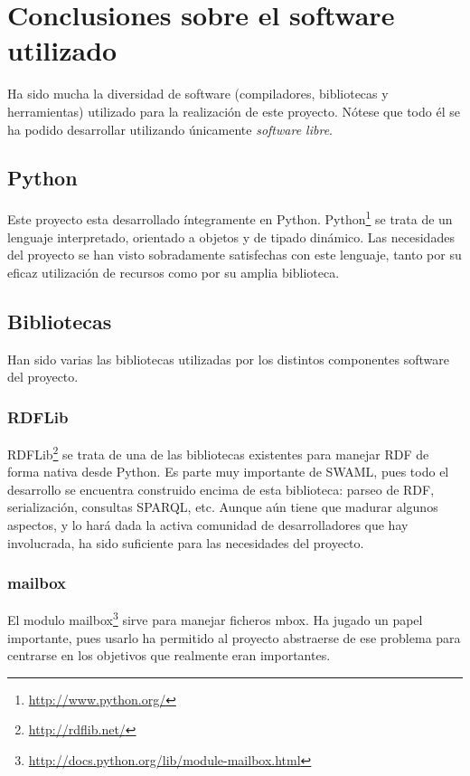 
\section{Conclusiones sobre el software utilizado}

Ha sido mucha la diversidad de software (compiladores, bibliotecas y herramientas)
utilizado para la realización de este proyecto. Nótese que todo él se ha podido
desarrollar utilizando únicamente \emph{software libre}.

\subsection{Python}

Este proyecto esta desarrollado íntegramente en Python. Python\footnote{\url{http://www.python.org/}}
se trata de un lenguaje interpretado, orientado a objetos y de tipado dinámico.
Las necesidades del proyecto se han visto sobradamente satisfechas con este lenguaje,
tanto por su eficaz utilización de recursos como por su amplia biblioteca. 

\subsection{Bibliotecas\label{sec:conclu:bib}}

Han sido varias las bibliotecas utilizadas por los distintos componentes software
del proyecto.

\subsubsection{RDFLib}

RDFLib\footnote{\url{http://rdflib.net/}} se trata de una de las bibliotecas
existentes para manejar RDF de forma nativa desde Python. Es parte muy 
importante de SWAML, pues todo el desarrollo se encuentra construido encima 
de esta biblioteca: parseo de RDF, serialización, consultas SPARQL, etc. Aunque 
aún tiene que madurar algunos aspectos, y lo hará dada la activa comunidad de
desarrolladores que hay involucrada, ha sido suficiente para las necesidades
del proyecto.

\subsubsection{mailbox}

El modulo mailbox\footnote{\url{http://docs.python.org/lib/module-mailbox.html}}
sirve para manejar ficheros mbox. Ha jugado un papel importante, pues usarlo
ha permitido al proyecto abstraerse de ese problema para centrarse en los
objetivos que realmente eran importantes.

